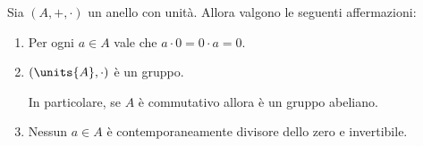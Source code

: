 \begin{proposition}
    \label{prop:prop_anelli}
    Sia $(A, +, \cdot)$ un anello con unità. Allora valgono le seguenti affermazioni:
    \begin{enumerate}[label={(\roman*)}, ref={\theproposition: (\roman*)}]
        \item \label{prop:prop_anelli:per_0} Per ogni $a \in A$ vale che $a \cdot 0 = 0 \cdot a = 0$.
        \item \label{prop:prop_anelli:gruppo_inv} $(\units{A}, \cdot)$ è un gruppo. 
        
        In particolare, se $A$ è commutativo allora è un gruppo abeliano.
        \item \label{prop:prop_anelli:div_zero_inv} Nessun $a \in A$ è contemporaneamente divisore dello zero e invertibile.
    \end{enumerate}
\end{proposition}
